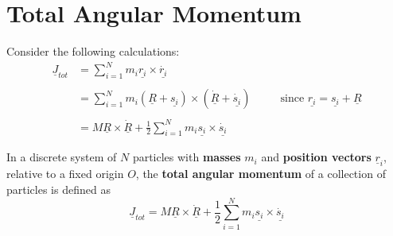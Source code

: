 \section{Total Angular Momentum}

Consider the following calculations:
\begin{align*}
	\underline{J}_{tot} & = \sum_{i=1}^{N}m_{i} \underline{r_i} \times \underline{\dot{r_i}}                                                                                                                                  \\ \\
	                    & = \sum_{i=1}^{N}m_{i}(\underline{R} + \underline{s_i}) \times (\underline{\dot{R}} + \underline{\dot{s_i}}) \ \ \ \ \ \ \ \ \ \ \ \ \text{since } \underline{r_i} = \underline{s_i} + \underline{R} \\ \\
	                    & = M \underline{R} \times \underline{\dot{R}} + \frac{1}{2}\sum_{i=1}^{N}m_{i}\underline{s_{i}} \times \underline{\dot{s_{i}}}
\end{align*}

\begin{definition}
	\label{def:total-angular-momentum}
	In a discrete system of $N$ particles with {\bf masses} $m_i$ and {\bf position vectors} $\underline{r}_i$, relative to a fixed origin $O$, the {\bf total angular momentum} of a collection of particles is defined as
	\begin{equation}
		\label{eq:total-angular-momentum}
		\underline{J}_{tot} = M \underline{R} \times \underline{\dot{R}} + \frac{1}{2}\sum_{i=1}^{N}m_{i}\underline{s_{i}} \times \underline{\dot{s_{i}}}
	\end{equation}
\end{definition}
